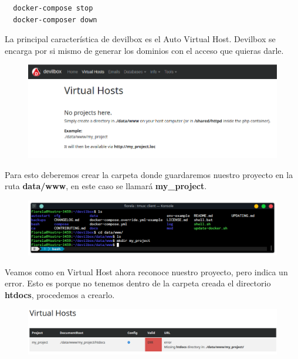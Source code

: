 \documentclass{article}
\begin{document}
\begin{verbatim}
  docker-compose stop
  docker-composer down
\end{verbatim}

La principal característica de devilbox es el Auto Virtual Host. Devilbox se
encarga por si mismo de generar los dominios con el acceso que quieras darle.

\begin{figure}[h!]
  \centering
  \includegraphics[scale=0.6]{./Pictures/Devilbox/020_virtual_hosts.png}
\end{figure}

Para esto deberemos crear la carpeta donde guardaremos nuestro proyecto en la
ruta \textbf{data/www}, en este caso se llamará \textbf{my\_project}.

\begin{figure}[h!]
  \centering
  \includegraphics[scale=0.65]{./Pictures/Devilbox/021_myproject.png}
\end{figure}

Veamos como en Virtual Host ahora reconoce nuestro proyecto, pero indica un
error. Esto es porque no tenemos dentro de la carpeta creada el directorio
\textbf{htdocs}, procedemos a crearlo.\\

\newpage

\begin{figure}[h!]
  \centering
  \includegraphics[scale=0.5]{./Pictures/Devilbox/022_virtual_hosts.png}
\end{figure}
\end{document}
